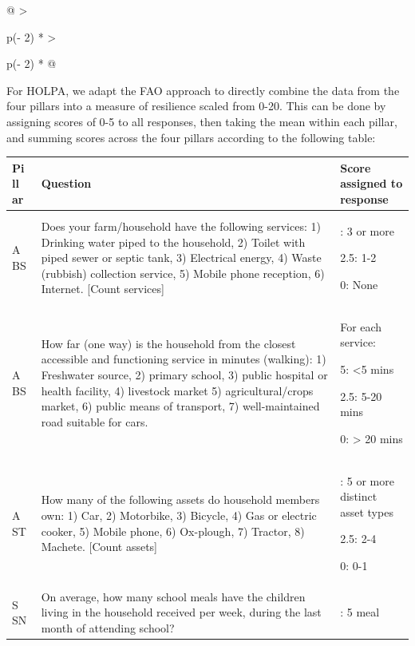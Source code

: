 \documentclass[
  letterpaper,
  DIV=11,
  numbers=noendperiod]{scrreprt}
\begin{document}
\begin{longtable}[]{@{}
  >{\raggedright\arraybackslash}p{}
  >{\raggedright\arraybackslash}p{}@{}}
\begin{minipage}[t]{\linewidth}
For HOLPA, we adapt the FAO approach to directly combine the data from
the four pillars into a measure of resilience scaled from 0-20. This can
be done by assigning scores of 0-5 to all responses, then taking the
mean within each pillar, and summing scores across the four pillars
according to the following table:

\begin{longtable}[]{@{}
  >{\raggedright\arraybackslash}p{}
  >{\raggedright\arraybackslash}p{}
  >{\raggedright\arraybackslash}p{}@{}}
\toprule\noalign{}
\begin{minipage}[b]{\linewidth}\raggedright
\textbf{ Pi ll ar }
\end{minipage} & \begin{minipage}[b]{\linewidth}\raggedright
\textbf{Question}
\end{minipage} & \begin{minipage}[b]{\linewidth}\raggedright
\textbf{Score assigned to response}
\end{minipage} \\
\midrule\noalign{}
\endhead
\bottomrule\noalign{}
\endlastfoot
A BS & Does your farm/household have the following services: 1) Drinking
water piped to the household, 2) Toilet with piped sewer or septic tank,
3) Electrical energy, 4) Waste (rubbish) collection service, 5) Mobile
phone reception, 6) Internet. {[}Count services{]} & 5: 3 or more

2.5: 1-2

0: None \\
A BS & How far (one way) is the household from the closest accessible
and functioning service in minutes (walking): 1) Freshwater source, 2)
primary school, 3) public hospital or health facility, 4) livestock
market 5) agricultural/crops market, 6) public means of transport, 7)
well-maintained road suitable for cars. & For each service:

5: \textless5 mins

2.5: 5-20 mins

0: \textgreater{} 20 mins \\
A ST & How many of the following assets do household members own: 1)
Car, 2) Motorbike, 3) Bicycle, 4) Gas or electric cooker, 5) Mobile
phone, 6) Ox-plough, 7) Tractor, 8) Machete. {[}Count assets{]} & 5: 5
or more distinct asset types

2.5: 2-4

0: 0-1 \\
S SN & On average, how many school meals have the children living in the
household received per week, during the last month of attending school?
& 5: 5 meal


\end{longtable}
\end{minipage}
\end{longtable}
\end{document}
